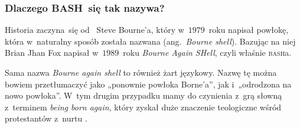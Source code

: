 \documentclass[10pt,t]{beamer}
\begin{document}
\begin{frame}
  \frametitle{Dlaczego BASH~się tak nazywa?}


  Historia zaczyna~się
  od~
  {Steve Bourne’a}, który w~$1979$~roku napisał powłokę, która w~naturalny
  sposób została nazwana
  (ang.~\textit{Bourne shell}). Bazując na niej
  {Brian Jhan Fox} napisał w~$1989$~roku \textit{Bourne Again SHell},
  czyli właśnie
  {\textsc{bash}a}.

  Sama nazwa \textit{Bourne again shell} to również żart językowy. Nazwę tę
  można bowiem przetłumaczyć jako „ponownie powłoka Borne’a”, jak
  i~„odrodzona na nowo powłoka”. W~tym drugim przypadku mamy do czynienia
  z~grą słowną z~terminem
  {\textit{being born again}}, który zyskał
  duże znaczenie teologiczne wśród protestantów z~nurtu
  .

\end{frame}
















\printbibliography





\end{document}
